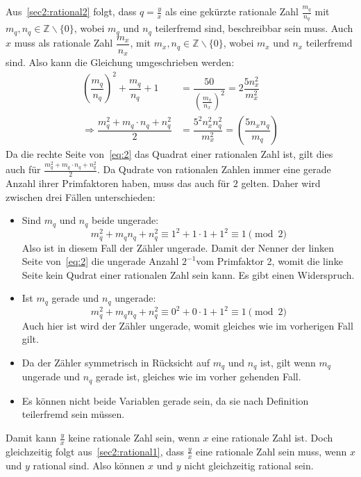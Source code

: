 \documentclass[10pt, a4paper]{amsart}
\makeatletter
\renewenvironment{proof}[1][\proofname]{\par
\pushQED{\qed}%
\normalfont \topsep6\p@\@plus6\p@\relax
\trivlist
\item\relax
{\bfseries#1}\hspace\labelsep\ignorespaces
}{%
\popQED\endtrivlist\@endpefalse
}
\makeatother
\begin{document}
\begin{proof}
  Aus~\autoref{sec2:rational2} folgt, dass $q=\frac{y}{x}$ als eine gekürzte
  rationale Zahl $\frac{m_q}{n_q}$ mit $m_q,n_q\in\mathbb{Z}\backslash\{0\}$,
  wobei $m_q$ und $n_q$ teilerfremd sind, beschreibbar sein muss. Auch $x$ muss
  als rationale Zahl $\dfrac{m_x}{n_x}$, mit
  $m_x,n_q\in\mathbb{Z}\backslash\{0\}$, wobei $m_x$ und $n_x$ teilerfremd sind.
  Also kann die Gleichung umgeschrieben werden:
  \begin{equation}
    \label{eq:2}
    \begin{split}
      \left(\dfrac{m_q}{n_q}\right)^2+\dfrac{m_q}{n_q}+1&=\dfrac{50}{\left(\frac{m_x}{n_x}\right)^2}=2\dfrac{5n_x^2}{m_x^2}\\
      \Rightarrow \dfrac{m_q^2+m_q\cdot n_q +
        n_q^2}{2}&=\dfrac{5^2n_x^2n_q^2}{m_x^2}=\left( \dfrac{5n_xn_q}{m_q}
      \right)
    \end{split}
  \end{equation}
  Da die rechte Seite von~\eqref{eq:2} das Quadrat einer rationalen Zahl ist,
  gilt dies auch für $\frac{m_q^2+m_q\cdot n_q + n_q^2}{2}$. Da Qudrate von
  rationalen Zahlen immer eine gerade Anzahl ihrer Primfaktoren haben, muss das
  auch für $2$ gelten. Daher wird zwischen drei Fällen unterschieden:
  \begin{itemize}[itemsep=2ex]
  \item Sind $m_q$ und $n_q$ beide ungerade:
    \[m_q^2+m_qn_q+n_q^2\equiv1^2+1\cdot1+1^2\equiv1\pmod{2}\] Also ist in
    diesem Fall der Zähler ungerade. Damit der Nenner der linken Seite
    von~\eqref{eq:2} die ungerade Anzahl $2^{-1}$vom Primfaktor 2, womit die
    linke Seite kein Qudrat einer rationalen Zahl sein kann. Es gibt einen
    Widerspruch.
  \item Ist $m_q$ gerade und $n_q$ ungerade:
    \[m_q^2+m_qn_q+n_q^2\equiv0^2+0\cdot1+1^2\equiv1\pmod{2}\] Auch hier ist
    wird der Zähler ungerade, womit gleiches wie im vorherigen Fall gilt.
  \item Da der Zähler symmetrisch in Rücksicht auf $m_q$ und $n_q$ ist, gilt
    wenn $m_q$ ungerade und $n_q$ gerade ist, gleiches wie im vorher gehenden
    Fall.
  \item Es können nicht beide Variablen gerade sein, da sie nach Definition teilerfremd sein
    müssen.
  \end{itemize}
  Damit kann $\frac{y}{x}$ keine rationale Zahl sein, wenn $x$ eine rationale
  Zahl ist. Doch gleichzeitig folgt aus~\autoref{sec2:rational1}, dass
  $\frac{y}{x}$ eine rationale Zahl sein muss, wenn $x$ und $y$ rational sind.
  Also können $x$ und $y$ nicht gleichzeitig rational sein.
\end{proof}
\end{document}
